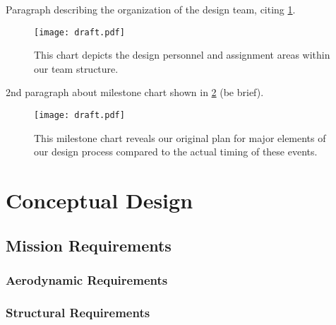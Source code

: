 \documentclass[report]{byu-aero}
\begin{document}
Paragraph describing the organization of the design team, citing \cref{fig:personnelassignments}.

\begin{figure}[h!]
	\centering
	\texttt{[image: draft.pdf]}
	\caption{This chart depicts the design personnel and assignment areas within our team structure.}
	\label{fig:personnelassignments}
\end{figure}

2nd paragraph about milestone chart shown in  \cref{fig:plannedvsactualtiming} (be brief).

\begin{figure}[h!]
	\centering
	\texttt{[image: draft.pdf]}
	\caption{This milestone chart reveals our original plan for major elements of our design process compared to the actual timing of these events.}
	\label{fig:plannedvsactualtiming}
\end{figure}

\section{Conceptual Design} %
\label{sec:ConceptualDesign}


\subsection{Mission Requirements}
\label{ssec:missionreqs}



\subsubsection{Aerodynamic Requirements}
\label{sssec:aeroreqs}


\subsubsection{Structural Requirements}
\label{sssec:structreqs}
\end{document}
